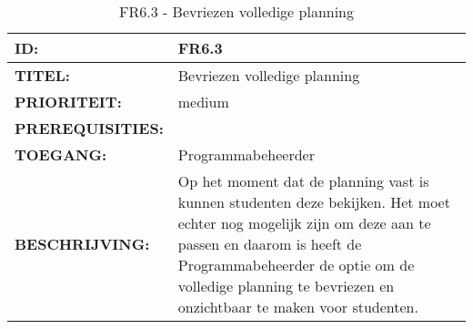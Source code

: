 \noindent\begin{table}[H]
            \begin{tabular}{l | p{10cm}}
                \textbf{ID:} & FR6.3 \\ \hline
                \textbf{TITEL:} & Bevriezen volledige planning\\ \hline
                \textbf{PRIORITEIT:} &  medium \\ \hline
                \textbf{PREREQUISITIES:} & \\ \hline
                \textbf{TOEGANG:} & Programmabeheerder \\ \hline
                \textbf{BESCHRIJVING:} & Op het moment dat de planning vast is kunnen studenten deze bekijken. Het moet echter nog mogelijk zijn om deze aan te passen en daarom is heeft de Programmabeheerder de optie om de volledige planning te bevriezen en onzichtbaar te maken voor studenten.\\ 
            \end{tabular}\\
            \caption{FR6.3 - Bevriezen volledige planning}
            \label{tab:FR6.3 - Bevriezen volledige planning}
        \end{table}   




\clearpage